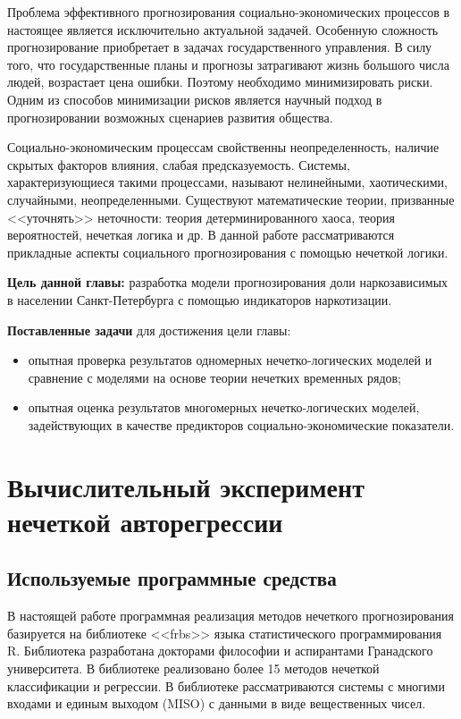 Проблема эффективного прогнозирования социально-экономических процессов в
настоящее является исключительно актуальной задачей. Особенную сложность
прогнозирование приобретает в задачах государственного управления. В силу того,
что государственные планы и прогнозы затрагивают жизнь большого числа людей,
возрастает цена ошибки. Поэтому необходимо минимизировать риски. Одним из
способов минимизации рисков является научный подход в прогнозировании возможных
сценариев развития общества.  

Социально-экономическим процессам свойственны неопределенность, наличие скрытых
факторов влияния, слабая предсказуемость. Системы, характеризующиеся такими
процессами, называют нелинейными, хаотическими, случайными, неопределенными.
Существуют математические теории, призванные <<уточнять>> неточности: теория
детерминированного хаоса, теория вероятностей, нечеткая логика и др. В данной
работе рассматриваются прикладные аспекты социального прогнозирования с помощью
нечеткой логики.

\textbf{Цель данной главы:} разработка модели прогнозирования доли
наркозависимых в населении Санкт-Петербурга с помощью индикаторов
наркотизации.%

\textbf{Поставленные задачи} для достижения цели главы:
\begin{itemize}
    \item опытная проверка результатов одномерных нечетко-логических моделей и
        сравнение с	моделями на основе теории нечетких временных рядов;
    \item опытная оценка результатов многомерных нечетко-логических моделей, 
        задействующих в качестве предикторов социально-экономические показатели.
\end{itemize} 

\section{Вычислительный эксперимент нечеткой авторегрессии}

\subsection{Используемые программные средства}

В настоящей работе программная реализация методов нечеткого прогнозирования
базируется на библиотеке <<frbs>> языка статистического программирования R.
Библиотека разработана докторами философии и аспирантами Гранадского
университета. В библиотеке реализовано более 15 методов нечеткой классификации и
регрессии. В библиотеке рассматриваются системы с многими входами и единым
выходом (MISO) с данными в виде вещественных чисел.

